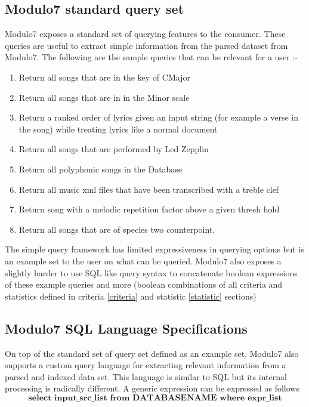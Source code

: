 \subsection{Modulo7 standard query set}

\noindent Modulo7 exposes a standard set of querying features to the consumer. These queries are useful to extract simple information from the parsed dataset from Modulo7. The following are the sample queries that can be relevant for a user :-

\begin{enumerate}
\item Return all songs that are in the key of CMajor
\item Return all songs that are in in the Minor scale
\item Return a ranked order of lyrics given an input string (for example a verse in the song) while treating lyrics like a normal document
\item Return all songs that are performed by Led Zepplin
\item Return all polyphonic songs in the Database
\item Return all music xml files that have been transcribed with a treble clef
\item Return song with a melodic repetition factor above a given thresh hold
\item Return all songs that are of species two counterpoint. 
\end{enumerate}

\noindent The simple query framework has limited expressiveness in querying options but is an example set to the user on what can be queried. Modulo7 also exposes a slightly harder to use SQL like query syntax to concatenate boolean expressions of these example queries and more (boolean combinations of all criteria and statistics defined in criteria \ref{criteria} and statistic \ref{statistic} sections)

\subsection{Modulo7 SQL Language Specifications}

\noindent On top of the standard set of query set defined as an example set, Modulo7 also supports a custom query language for extracting relevant information from a parsed and indexed data set. This language is similar to SQL but its internal processing is radically different. A generic expression can be expressed as follows
\begin{equation}
\textbf{select input\_src\_list  from DATABASENAME where expr\_list}
\end{equation}

